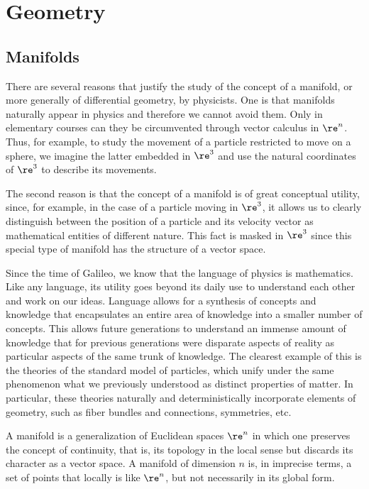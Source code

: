 

\chapter{Geometry}





\section{Manifolds}

There are several reasons that justify the study of the concept of a manifold, or more generally of differential geometry, by physicists.
One is that manifolds naturally appear in physics and therefore we cannot avoid them.
Only in elementary courses can they be circumvented through vector calculus in $\re^n$. 
Thus, for example, to study the movement of a particle restricted to move on a sphere, we imagine the latter embedded in $\re^3$ and use the natural coordinates of $\re^3$ to describe its movements.

The second reason is that the concept of a manifold is of great conceptual utility, since, for example, in the case of a particle moving in $\re^3$, it allows us to clearly distinguish between the position of a particle and its velocity vector as mathematical entities of different nature.
This fact is masked in $\re^3$ since this special type of manifold has the structure of a vector space.

Since the time of Galileo, we know that the language of physics is mathematics.
Like any language, its utility goes beyond its daily use to understand each other and work on our ideas. Language allows for a synthesis of concepts and knowledge that encapsulates an entire area of knowledge into a smaller number of concepts.
This allows future generations to understand an immense amount of knowledge that for previous generations were disparate aspects of reality as particular aspects of the same trunk of knowledge.
The clearest example of this is the theories of the standard model of particles, which unify under the same phenomenon what we previously understood as distinct properties of matter.
In particular, these theories naturally and deterministically incorporate elements of geometry, such as fiber bundles and connections, symmetries, etc.

A manifold is a generalization of Euclidean spaces $\re^n$ in which one preserves the concept of continuity, that is, its topology in the local sense but discards its character as a vector space. A manifold of dimension $n$ is, in imprecise terms, a set of points that locally is like $\re^n$, but not necessarily in its global form.

